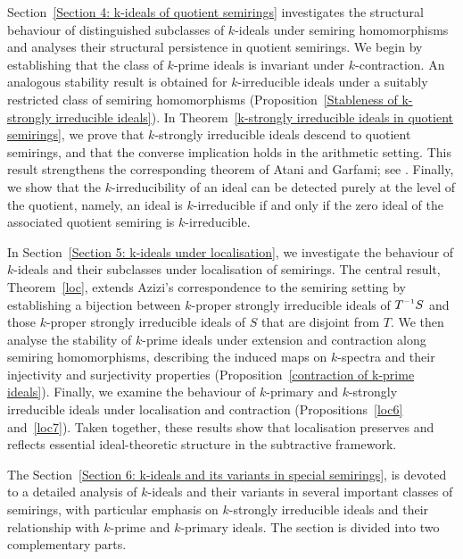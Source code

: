\documentclass[11pt,english]{amsart}
\newcommand{\inv}{^{\raisebox{.2ex}{$\scriptscriptstyle-1$}}}
\theoremstyle{definition}
\numberwithin{equation}{section}
\begin{document}
Section~\ref{Section 4: k-ideals of quotient semirings} investigates the structural behaviour of distinguished subclasses of $k$-ideals under semiring homomorphisms and analyses their structural persistence in quotient semirings. We begin by establishing that the class of $k$-prime ideals is invariant under $k$-contraction. An analogous stability result is obtained for $k$-irreducible ideals under a suitably restricted class of semiring homomorphisms (Proposition~\ref{Stableness of k-strongly irreducible ideals}). In Theorem~\ref{k-strongly irreducible ideals in quotient semirings}, we prove that $k$-strongly irreducible ideals descend to quotient semirings, and that the converse implication holds in the arithmetic setting. This result strengthens the corresponding theorem of Atani and Garfami; see \cite[Theorem~2.7]{AtaniGarfami13}. Finally, we show that the $k$-irreducibility of an ideal can be detected purely at the level of the quotient, namely, an ideal is $k$-irreducible if and only if the zero ideal of the associated quotient semiring is $k$-irreducible.

In Section~\ref{Section 5: k-ideals under localisation}, we investigate the behaviour of \(k\)-ideals and their subclasses under localisation of semirings. The central result, Theorem~\ref{loc}, extends Azizi’s correspondence to the semiring setting by establishing a bijection between \(k\)-proper strongly irreducible ideals of \(T\inv S\) and those \(k\)-proper strongly irreducible ideals of \(S\) that are disjoint from \(T\). We then analyse the stability of \(k\)-prime ideals under extension and contraction along semiring homomorphisms, describing the induced maps on \(k\)-spectra and their injectivity and surjectivity properties (Proposition~\ref{contraction of k-prime ideals}). Finally, we examine the behaviour of \(k\)-primary and \(k\)-strongly irreducible ideals under localisation and contraction (Propositions~\ref{loc6} and~\ref{loc7}). Taken together, these results show that localisation preserves and reflects essential ideal-theoretic structure in the subtractive framework.

The Section~\ref{Section 6: k-ideals and its variants in special semirings}, is devoted to a detailed analysis of $k$-ideals and their variants in several important classes of semirings, with particular emphasis on $k$-strongly irreducible ideals and their relationship with $k$-prime and $k$-primary ideals. The section is divided into two complementary parts.
\end{document}
